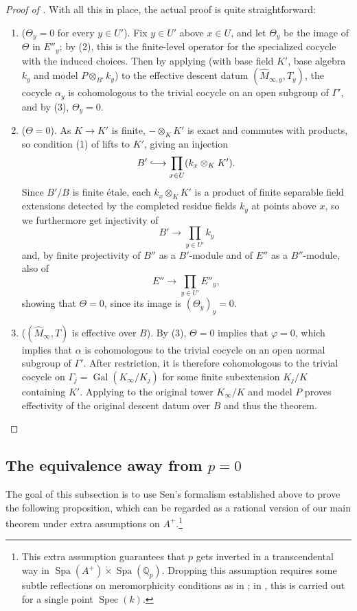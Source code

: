 \documentclass[10pt,twoside]{article}
\numberwithin{equation}{section}
\theoremstyle{plain}
\theoremstyle{definition}
\DeclareMathOperator{\Spec}{Spec}
\DeclareMathOperator{\Spa}{Spa}
\DeclareMathOperator{\Gal}{Gal}
\newcommand{\QQ}{\mathbb{Q}}
\let \phi \varphi
\begin{document}
\begin{proof}[Proof of ]
 With all this in place, the actual proof is quite straightforward:

\begin{enumerate}
\item (\(\Theta_y=0\) for every \(y\in U'\)).
Fix \(y\in U'\) above \(x\in U\), and let \(\Theta_y\) be the image of \(\Theta\) in \(E''_y\); by  (2), this is the finite-level operator for the specialized cocycle with the induced choices. Then by applying  (with base field \(K'\), base algebra \(k_y\) and model \(P\otimes_{B'}k_y\)) to the effective descent datum \((\hat M_{\infty,y},T_y)\), the cocycle \(\alpha_y\) is cohomologous to the trivial cocycle on an open subgroup of \(\Gamma'\), and by  (3), \(\Theta_y=0\).
\item (\(\Theta=0\)).
As \(K\to K'\) is finite, \(- \otimes_K K'\) is exact and commutes with products, so condition (1) of  lifts to \(K'\), giving an injection
\[
B'\lhook\joinrel\longrightarrow
\prod_{x\in U}(k_x\otimes_K K').
\]
Since \(B'/B\) is finite \'{e}tale, each \(k_x\otimes_K K'\) is a product of finite separable field extensions detected by the completed residue fields \(k_y\) at points above \(x\), so we furthermore get injectivity of
\[
B'\longrightarrow\prod_{y\in U'}k_y
\]
and, by finite projectivity of \(B''\) as a \(B'\)-module and of \(E''\) as a \(B''\)-module, also of
\[E''\longrightarrow\prod_{y\in U'}E''_y,\]
showing that \(\Theta=0\), since its image is \((\Theta_y)_y=0\).

\item (\((\hat M_\infty,T)\) is effective over \(B\)).
By  (3), \(\Theta=0\) implies that \(\phi=0\), which implies that \(\alpha\) is cohomologous to the trivial cocycle on an open normal subgroup of \(\Gamma'\). After restriction, it is therefore cohomologous to the trivial cocycle on \(\Gamma_j=\Gal(K_\infty/K_j)\) for some finite subextension \(K_j/K\) containing \(K'\). Applying  to the original tower \(K_\infty/K\) and model \(P\) proves effectivity of the original descent datum over \(B\) and thus the theorem.
\end{enumerate}
\end{proof}
\subsection{\texorpdfstring{The equivalence away from \(p=0\)}
  {The equivalence away from p=0}}
The goal of this subsection is to use Sen's formalism established above to prove the following proposition, which can be regarded as a rational version of our main theorem under extra assumptions on \(A^+\).\footnote{This extra assumption guarantees that \(p\) gets inverted in a transcendental way in \(\Spa(A^+)\dot\times\Spa(\QQ_p)\). Dropping this assumption requires some subtle reflections on meromorphicity conditions as in \cite{GI23}; in \cite{Ans22}, this is carried out for a single point \(\Spec(k)\).}
\end{document}
